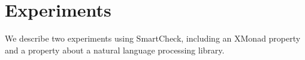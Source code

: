 \documentclass{sigplanconf}
\newcommand{\ttp}[1]{\texttt{#1}}
\begin{document}
\section{Experiments}\label{sec:experiments}
We describe two experiments using SmartCheck, including an XMonad property and a
property about a natural language processing library.

\end{document}
